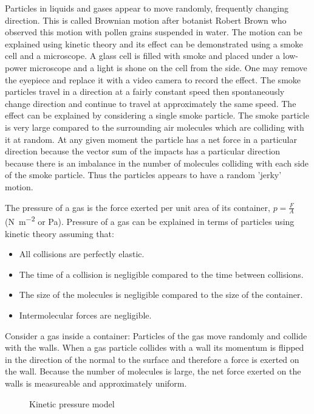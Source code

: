 \documentclass[a4,8pt]{article}
\begin{document}
Particles in liquids and gases appear to move randomly, frequently changing direction. This is called Brownian motion after botanist Robert Brown who observed this motion with pollen grains suspended in water. The motion can be explained using kinetic theory and its effect can be demonstrated using a smoke cell and a microscope. A glass cell is filled with smoke and placed under a low-power microscope and a light is shone on the cell from the side. One may remove the eyepiece and replace it with a video camera to record the effect. The smoke particles travel in a direction at a fairly constant speed then spontaneously change direction and continue to travel at approximately the same speed. The effect can be explained by considering a single smoke particle. The smoke particle is very large compared to the surrounding air molecules which are colliding with it at random. At any given moment the particle has a net force in a particular direction because the vector sum of the impacts has a particular direction because there is an imbalance in the number of molecules colliding with each side of the smoke particle. Thus the particles appears to have a random 'jerky' motion.

The pressure of a gas is the force exerted per unit area of its container, $p=\frac{F}{A}$ (\si{\newton\per\square\meter} or \si{\pascal}). Pressure of a gas can be explained in terms of particles using kinetic theory assuming that:

\begin{itemize}
	\item All collisions are perfectly elastic.
	\item The time of a collision is negligible compared to the time between collisions.
	\item The size of the molecules is negligible compared to the size of the container.
	\item Intermolecular forces are negligible.
\end{itemize}

Consider a gas inside a container: Particles of the gas move randomly and collide with the walls. When a gas particle collides with a wall its momentum is flipped in the direction of the normal to the surface and therefore a force is exerted on the wall. Because the number of molecules is large, the net force exerted on the walls is measureable and approximately uniform.

\begin{figure}[H]
\begin{tikzpicture}
\end{tikzpicture}
\caption{Kinetic pressure model}
\end{figure}
\end{document}

